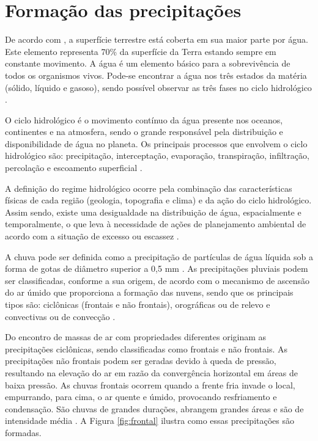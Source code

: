 \section{Formação das precipitações}

De acordo com , a superfície terrestre está coberta em sua maior parte por água. Este elemento representa 70\% da superfície da Terra estando sempre em constante movimento. A água é um elemento básico para a sobrevivência de todos os organismos vivos. Pode-se encontrar a água nos três estados da matéria (sólido, líquido e gasoso), sendo possível observar as três fases no ciclo hidrológico \cite{artigo-ciclo}.

O ciclo hidrológico é o movimento contínuo da água presente nos oceanos, continentes e na atmosfera, sendo o grande responsável pela distribuição e disponibilidade de água no planeta. Os principais processos que envolvem o ciclo hidrológico são: precipitação, interceptação, evaporação, transpiração, infiltração, percolação e escoamento superficial \cite{artigo-ciclo}.

A definição do regime hidrológico ocorre pela combinação das características físicas de cada região (geologia, topografia e clima) e da ação do ciclo hidrológico. Assim sendo, existe uma desigualdade na distribuição de água, espacialmente e temporalmente, o que leva à necessidade de ações de planejamento ambiental de acordo com a situação de excesso ou escassez \cite{artigo-ciclo}.

A chuva pode ser definida como a precipitação de partículas de água líquida sob a forma de gotas de diâmetro superior a 0,5 mm \cite{hidrogeografia}. As precipitações pluviais podem ser classificadas, conforme a sua origem, de acordo com o mecanismo de ascensão do ar úmido que proporciona a formação das nuvens, sendo que os principais tipos são: ciclônicas (frontais e não frontais), orográficas ou de relevo e convectivas ou de convecção \cite{ciclo-hidrologico}.

Do encontro de massas de ar com propriedades diferentes originam as precipitações ciclônicas, sendo classificadas como frontais e não frontais. As precipitações não frontais podem ser geradas devido à queda de pressão, resultando na elevação do ar em razão da convergência horizontal em áreas de baixa pressão. As chuvas frontais ocorrem quando a frente fria invade o local, empurrando, para cima, o ar quente e úmido, provocando resfriamento e condensação. São chuvas de grandes durações, abrangem grandes áreas e são de intensidade média \cite{tucci1993}. A Figura \ref{fig:frontal} ilustra como essas precipitações são formadas.

